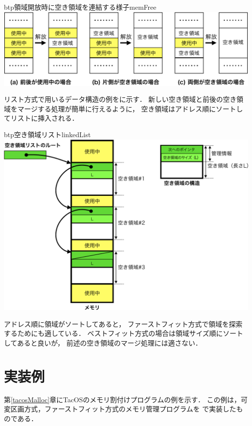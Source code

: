 \begin{itemize}
  \begin{myfig}{btp}{領域開放時に空き領域を連結する様子}{memFree}
    \includegraphics[scale=0.80]{Fig/memFree-crop.pdf}
  \end{myfig}

  リスト方式で用いるデータ構造の例をに示す．
  新しい空き領域と前後の空き領域をマージする処理が簡単に行えるように，
  空き領域はアドレス順にソートしてリストに挿入される．

  \begin{myfig}{btp}{空き領域リスト}{linkedList}
    \includegraphics[scale=0.66]{Fig/linkedList-crop.pdf}
  \end{myfig}

  アドレス順に領域がソートしてあると，
  ファーストフィット方式で領域を探索するためにも適している．
  ベストフィット方式の場合は領域サイズ順にソートしてあると良いが，
  前述の空き領域のマージ処理には適さない．
\end{itemize}

\section{実装例}
第\ref{tacosMalloc}章にTacOSのメモリ割付けプログラムの例を示す．
この例は，可変区画方式，ファーストフィット方式のメモリ管理プログラムを
{\cmml}で実装したものである．

